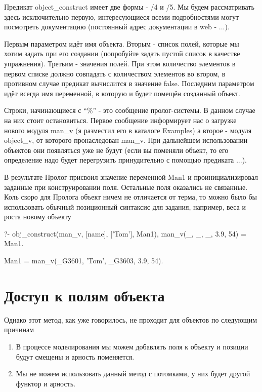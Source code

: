\documentclass[a4paper]{book}
\begin{document}
Предикат object\_construct имеет две формы - /4 и /5. Мы будем
рассматривать здесь исключительно первую, интересующиеся всеми
подробностями могут посмотреть документацию (постоянный адрес
документации в web - ...).

Первым параметром идёт имя объекта. Вторым - список полей,
которые мы хотим задать при его создании (попробуйте задать
пустой список в качестве упражнения). Третьим - значения
полей. При этом количество элементов в первом списке должно
совпадать с количеством элементов во втором, в противном случае
предикат вычислится в значение false. Последним параметром идёт
всегда имя переменной, в которую и будет помещён созданный
объект. 

Строки, начинающиеся с ``\%'' - это сообщение пролог-системы. В
данном случае на них стоит остановиться. Первое сообщение
информирует нас о загрузке нового модуля man\_v (я разместил его
в каталоге Examples) а второе - модуля object\_v, от которого
пронаследован man\_v. При дальнейшем использовании объектов они
появляться уже не будут (если вы поменяли объект, то его
определение надо будет перегрузить принудительно с помощью
предиката ...).

В результате Пролог присвоил значение переменной Man1 и
проинициализировал заданные при конструировании поля. Остальные
поля оказались не связанные. Коль скоро для Пролога объект ничем
не отличается от терма, то можно было бы использовать обычный
позиционный синтаксис для задания, например, веса и роста новому
объекту

\begin{example}{}{}
?- obj_construct(man_v, [name], ['Tom'], Man1), 
   man_v(_, _, _, 3.9, 54) = Man1.

Man1 = man_v(_G3601, 'Tom', _G3603, 3.9, 54).
\end{example}


\section{Доступ к полям объекта}

Однако этот метод, как уже говорилось, не проходит для объектов
по следующим причинам

\begin{enumerate}
\item В процессе моделирования мы можем добавлять поля к объекту и
позиции будут смещены и арность поменяется.
\item Мы не можем использовать данный метод с потомками, у них будет
другой функтор и арность.
\end{enumerate}
\end{document}

